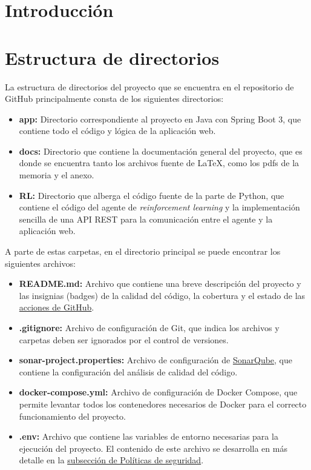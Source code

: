 
\section{Introducción}

\section{Estructura de directorios}
\label{sec:estructura-directorios}

La estructura de directorios del proyecto que se encuentra en el repositorio de GitHub principalmente consta de los siguientes directorios:
\begin{itemize}
    \item \textbf{app:} Directorio correspondiente al proyecto en Java con Spring Boot 3, que contiene todo el código y lógica de la aplicación web.
    \item \textbf{docs:} Directorio que contiene la documentación general del proyecto, que es donde se encuentra tanto los archivos fuente de LaTeX, como los pdfs de la memoria y el anexo.
    \item \textbf{RL:} Directorio que alberga el código fuente de la parte de Python, que contiene el código del agente de \textit{reinforcement learning} y la implementación sencilla de una API REST para la comunicación entre el agente y la aplicación web.
\end{itemize}
A parte de estas carpetas, en el directorio principal se puede encontrar los siguientes archivos:
\begin{itemize}
    \item \textbf{README.md:} Archivo que contiene una breve descripción del proyecto y las insignias (badges) de la calidad del código, la cobertura y el estado de las \hyperref[subsec:acciones]{acciones de GitHub}.    
    \item \textbf{.gitignore:} Archivo de configuración de Git, que indica los archivos y carpetas deben ser ignorados por el control de versiones.
    \item \textbf{sonar-project.properties:} Archivo de configuración de \hyperref[subsec:sonarqube]{SonarQube}, que contiene la configuración del análisis de calidad del código.
    \item \textbf{docker-compose.yml:} Archivo de configuración de Docker Compose, que permite levantar todos los contenedores necesarios  de Docker para el correcto funcionamiento del proyecto.
    \item \textbf{.env:} Archivo que contiene las variables de entorno necesarias para la ejecución del proyecto. El contenido de este archivo se desarrolla en más detalle en la \hyperref[subsec:politicas]{subsección de Políticas de seguridad}.
\end{itemize}


